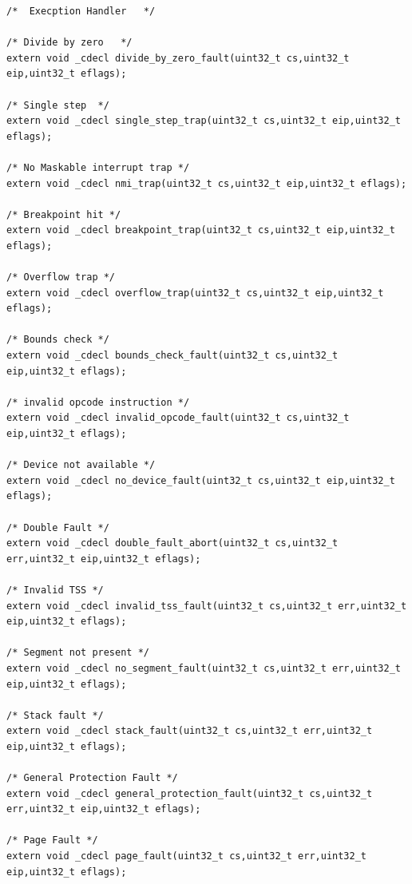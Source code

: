 \documentclass[document.tex]{subfiles}
\begin{document}
\begin{english}

\lstset{numberstyle=\tiny,numbers=left,stepnumber=1,numbersep=5pt,tabsize=2,extendedchars=true,breaklines=true,frame=b,showspaces=false, showtabs=false,xleftmargin=10pt,framexleftmargin=10pt,framexrightmargin=5pt,framexbottommargin=4pt,showstringspaces=false,language=C++}


\begin{lstlisting}[label=lst:exception.h,caption=\en{kernel/exception.h}]
/*	Execption Handler	*/

/* Divide by zero	*/
extern void _cdecl divide_by_zero_fault(uint32_t cs,uint32_t eip,uint32_t eflags);

/* Single step	*/
extern void _cdecl single_step_trap(uint32_t cs,uint32_t eip,uint32_t eflags);

/* No Maskable interrupt trap */
extern void _cdecl nmi_trap(uint32_t cs,uint32_t eip,uint32_t eflags);

/* Breakpoint hit */
extern void _cdecl breakpoint_trap(uint32_t cs,uint32_t eip,uint32_t eflags);

/* Overflow trap */
extern void _cdecl overflow_trap(uint32_t cs,uint32_t eip,uint32_t eflags);

/* Bounds check */
extern void _cdecl bounds_check_fault(uint32_t cs,uint32_t eip,uint32_t eflags);

/* invalid opcode instruction */
extern void _cdecl invalid_opcode_fault(uint32_t cs,uint32_t eip,uint32_t eflags);

/* Device not available */
extern void _cdecl no_device_fault(uint32_t cs,uint32_t eip,uint32_t eflags);

/* Double Fault */
extern void _cdecl double_fault_abort(uint32_t cs,uint32_t err,uint32_t eip,uint32_t eflags);

/* Invalid TSS */
extern void _cdecl invalid_tss_fault(uint32_t cs,uint32_t err,uint32_t eip,uint32_t eflags);

/* Segment not present */
extern void _cdecl no_segment_fault(uint32_t cs,uint32_t err,uint32_t eip,uint32_t eflags);

/* Stack fault */
extern void _cdecl stack_fault(uint32_t cs,uint32_t err,uint32_t eip,uint32_t eflags);

/* General Protection Fault */
extern void _cdecl general_protection_fault(uint32_t cs,uint32_t err,uint32_t eip,uint32_t eflags);

/* Page Fault */
extern void _cdecl page_fault(uint32_t cs,uint32_t err,uint32_t eip,uint32_t eflags);


\end{lstlisting}
\end{english}
\end{document}
